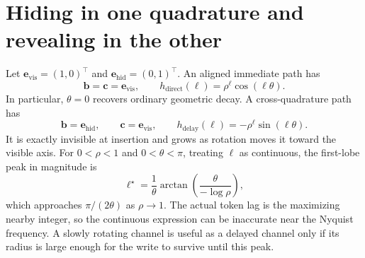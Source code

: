 \documentclass[11pt]{article}
\newcommand{\ve}[1]{\boldsymbol{#1}}
\newcommand{\tr}{\intercal}
\begin{document}
\section{Hiding in one quadrature and revealing in the other}

Let $\ve{e}_{\mathrm{vis}}=(1,0)^{\tr}$ and
$\ve{e}_{\mathrm{hid}}=(0,1)^{\tr}$. An aligned immediate path has
\begin{equation}
  \ve{b}=\ve{c}=\ve{e}_{\mathrm{vis}},
  \qquad
  h_{\mathrm{direct}}(\ell)
  =\rho^\ell\cos(\ell\theta).
\end{equation}
In particular, $\theta=0$ recovers ordinary geometric decay. A cross-quadrature path has
\begin{equation}
  \ve{b}=\ve{e}_{\mathrm{hid}},
  \qquad
  \ve{c}=\ve{e}_{\mathrm{vis}},
  \qquad
  h_{\mathrm{delay}}(\ell)
  =-\rho^\ell\sin(\ell\theta).
  \label{eq:quadrature-delay}
\end{equation}
It is exactly invisible at insertion and grows as rotation moves it toward the visible axis.
For $0<\rho<1$ and $0<\theta<\pi$, treating $\ell$ as continuous, the first-lobe peak in
magnitude is
\begin{equation}
  \ell^\star
  =\frac{1}{\theta}
   \arctan\!\left(\frac{\theta}{-\log\rho}\right),
  \label{eq:delayed-peak}
\end{equation}
which approaches $\pi/(2\theta)$ as $\rho\to1$. The actual token lag is the maximizing nearby
integer, so the continuous expression can be inaccurate near the Nyquist frequency. A slowly
rotating channel is useful as a delayed channel only if its radius is large enough for the
write to survive until this peak.
\end{document}

